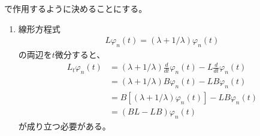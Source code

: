 \documentclass{jsarticle}
\begin{document}
で作用するように決めることにする。
\begin{enumerate}
\item 線形方程式
\begin{align}
L\varphi_{n}(t)=(\lambda+1/\lambda)\varphi_{n}(t)
\end{align}
の両辺を$t$微分すると、
\begin{align}
L_{t}\varphi_{n}(t)
&=(\lambda+1/\lambda)\frac{d}{dt}\varphi_{n}(t)
-L\frac{d}{dt}\varphi_{n}(t)\\
&=(\lambda+1/\lambda)B\varphi_{n}(t)-LB\varphi_{n}(t)\\
&=B\left[(\lambda+1/\lambda)\varphi_{n}(t)\right]-LB\varphi_{n}(t)\\
&=(BL-LB)\varphi_{n}(t)
\end{align}
が成り立つ必要がある。
\end{enumerate}
\end{document}
